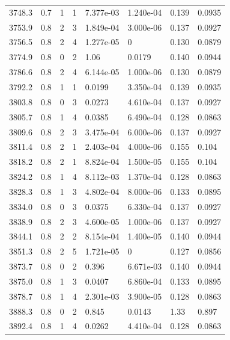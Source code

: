 \documentclass[preview]{standalone}
\begin{document}
{{{{{{{{{{{{{{{\begin{tabular}{L{1.2cm}C{1.2cm} C{0.3cm}C{0.5cm} C{1.4cm}C{1.4cm} C{1.4cm}C{1.4cm}}
  3748.3  &   0.7  & 1     &  1 &  7.377e-03  & 1.240e-04  & 0.139 &  0.0935   \\ 
  3753.9  &   0.8  & 2     &  3 &  1.849e-04  & 3.000e-06  & 0.137 &  0.0927   \\ 
  3756.5  &   0.8  & 2     &  4 &  1.277e-05  & 0  & 0.130 &  0.0879   \\ 
  3774.9  &   0.8  & 0     &  2 &  1.06  & 0.0179  & 0.140 &  0.0944   \\ 
  3786.6  &   0.8  & 2     &  4 &  6.144e-05  & 1.000e-06  & 0.130 &  0.0879   \\ 
  3792.2  &   0.8  & 1     &  1 &  0.0199  & 3.350e-04  & 0.139 &  0.0935   \\ 
  3803.8  &   0.8  & 0     &  3 &  0.0273  & 4.610e-04  & 0.137 &  0.0927   \\ 
  3805.7  &   0.8  & 1     &  4 &  0.0385  & 6.490e-04  & 0.128 &  0.0863   \\ 
  3809.6  &   0.8  & 2     &  3 &  3.475e-04  & 6.000e-06  & 0.137 &  0.0927   \\ 
  3811.4  &   0.8  & 2     &  1 &  2.403e-04  & 4.000e-06  & 0.155 &  0.104   \\ 
  3818.2  &   0.8  & 2     &  1 &  8.824e-04  & 1.500e-05  & 0.155 &  0.104   \\ 
  3824.2  &   0.8  & 1     &  4 &  8.112e-03  & 1.370e-04  & 0.128 &  0.0863   \\ 
  3828.3  &   0.8  & 1     &  3 &  4.802e-04  & 8.000e-06  & 0.133 &  0.0895   \\ 
  3834.0  &   0.8  & 0     &  3 &  0.0375  & 6.330e-04  & 0.137 &  0.0927   \\ 
  3838.9  &   0.8  & 2     &  3 &  4.600e-05  & 1.000e-06  & 0.137 &  0.0927   \\ 
  3844.1  &   0.8  & 2     &  2 &  8.154e-04  & 1.400e-05  & 0.140 &  0.0944   \\ 
  3851.3  &   0.8  & 2     &  5 &  1.721e-05  & 0  & 0.127 &  0.0856   \\ 
  3873.7  &   0.8  & 0     &  2 &  0.396  & 6.671e-03  & 0.140 &  0.0944   \\ 
  3875.0  &   0.8  & 1     &  3 &  0.0407  & 6.860e-04  & 0.133 &  0.0895   \\ 
  3878.7  &   0.8  & 1     &  4 &  2.301e-03  & 3.900e-05  & 0.128 &  0.0863   \\ 
  3888.3  &   0.8  & 0     &  2 &  0.845  & 0.0143  & 1.33 &  0.897   \\ 
  3892.4  &   0.8  & 1     &  4 &  0.0262  & 4.410e-04  & 0.128 &  0.0863   \\ 

\end{tabular}}}}}}}}}}}}}}}}
\end{document}
